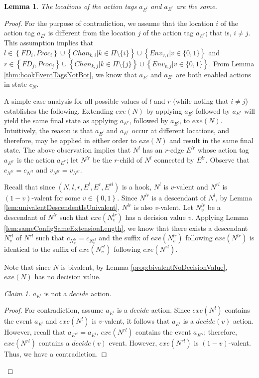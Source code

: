 \documentclass[11pt]{article}
\numberwithin{theorem}{section}
\newtheorem{lemma}[theorem]{Lemma}
\newcommand{\set}[1]{\left\{#1\right\}}
\begin{document}
\begin{lemma}\label{thm:sameCriticalProcess}
The locations of the action tags $a_{E^l}$ and $a_{E^r}$ are the same.
\end{lemma}

\begin{proof}
For the purpose of contradiction, we assume that the location $i$ of the action tag $a_{E^l}$ is different from the location $j$ of the action tag $a_{E^r}$; that is, $i \neq j$.
This assumption implies that $l \in \set{FD_i, Proc_i} \cup \set{Chan_{k,i} | k \in \Pi\setminus \{i\}} \cup \set{Env_{v,i}| v \in \{0,1\}}$ and $r \in \set{FD_j, Proc_j} \cup \set{Chan_{k,j}|k \in \Pi\setminus \{j\}} \cup \set{Env_{v,j} | v \in \{0,1\}}$. From Lemma \ref{thm:hookEventTagsNotBot}, we know that $a_{E^l}$ and $a_{E^r}$ are both enabled actions in state $c_N$. 

A simple case analysis for all possible values of $l$ and $r$ (while noting that $i\neq j$) establishes the following. Extending $exe(N)$ by applying $a_{E^l}$ followed by $a_{E^r}$ will yield the same final state as applying $a_{E^r}$, followed by $a_{E^l}$, to $exe(N)$. Intuitively, the reason is that $a_{E^l}$ and $a_{E^r}$ occur at different locations, and therefore, may be applied in either order to $exe(N)$ and result in the same final state. The above observation implies that $N^l$ has an $r$-edge $E^{lr}$ whose action tag $a_{E^{lr}}$ is the action $a_{E^r}$; let $N^{lr}$ be the $r$-child of $N^l$ connected by $E^{lr}$.
Observe that $c_{N^{lr}} = c_{N^{rl}}$ and $v_{N^{lr}} = v_{N^{rl}}$.


Recall that since $(N,l,r,E^l,E^r,E^{rl})$ is a hook, $N^l$ is $v$-valent and $N^{rl}$ is $(1-v)$-valent for some $v \in \set{0,1}$. Since $N^{lr}$ is a descendant of $N^l$, by Lemma \ref{lem:univalentDescendentIsUnivalent}, $N^{lr}$ is also $v$-valent. Let $N^{lr}_{v}$ be a descendant of $N^{lr}$ such that $exe(N^{lr}_{v})$ has a decision value $v$. 
Applying Lemma \ref{lem:sameConfigSameExtensionLength},  we know that there exists a descendant $N^{rl}_{v}$ of $N^{rl}$ such that $c_{N^{lr}_{v}} = c_{N^{rl}_{v}}$ and the suffix of $exe(N^{lr}_{v})$ following $exe(N^{lr})$ is identical to the suffix of $exe(N^{rl}_{v})$ following $exe(N^{rl})$.

Note that since $N$ is bivalent, by Lemma \ref{prop:bivalentNoDecisionValue}, $exe(N)$ has no decision value.

\emph{Claim 1.} $a_{E^l}$ is not a $decide$ action.
\begin{proof}
For contradiction, assume $a_{E^l}$ is a $decide$ action. Since $exe(N^l)$ contains the event $a_{E^l}$ and $exe(N^l)$ is $v$-valent, it follows that $a_{E^l}$ is a $decide(v)$ action. However, recall that $a_{E^{rl}} = a_{E^l}$, $exe(N^{rl})$ contains the event $a_{E^{rl}}$; therefore, $exe(N^{rl})$ contains a $decide(v)$ event. However, $exe(N^{rl})$ is $(1-v)$-valent. Thus, we have a contradiction.
\end{proof}


\end{proof}
\end{document}
